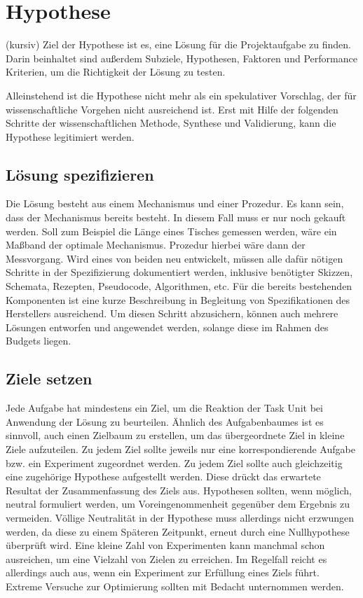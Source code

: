\section{Hypothese}

(kursiv)
Ziel der Hypothese ist es, eine Lösung für die Projektaufgabe zu finden. Darin beinhaltet 
sind außerdem Subziele, Hypothesen, Faktoren und Performance Kriterien, um die Richtigkeit der 
Lösung zu testen.

Alleinstehend ist die Hypothese nicht mehr als ein spekulativer Vorschlag, der für wissenschaftliche 
Vorgehen nicht ausreichend ist. Erst mit Hilfe der folgenden Schritte der wissenschaftlichen Methode, 
Synthese und Validierung, kann die Hypothese legitimiert werden.

    \subsection{Lösung spezifizieren}

    Die Lösung besteht aus einem Mechanismus und einer Prozedur. Es kann sein, dass der Mechanismus
    bereits besteht. In diesem Fall muss er nur noch gekauft werden. Soll zum Beispiel die Länge 
    eines Tisches gemessen werden, wäre ein Maßband der optimale Mechanismus. Prozedur hierbei 
    wäre dann der Messvorgang. Wird eines von beiden neu entwickelt, müssen alle dafür nötigen 
    Schritte in der Spezifizierung dokumentiert werden, inklusive benötigter Skizzen, Schemata, 
    Rezepten, Pseudocode, Algorithmen, etc. Für die bereits bestehenden Komponenten ist eine kurze
    Beschreibung in Begleitung von Spezifikationen des Herstellers ausreichend. 
    Um diesen Schritt abzusichern, können auch mehrere Lösungen entworfen und angewendet werden, 
    solange diese im Rahmen des Budgets liegen.

    \subsection{Ziele setzen}

    Jede Aufgabe hat mindestens ein Ziel, um die Reaktion der Task Unit bei Anwendung der Lösung zu 
    beurteilen. Ähnlich des Aufgabenbaumes ist es sinnvoll, auch einen Zielbaum zu erstellen, um 
    das übergeordnete Ziel in kleine Ziele aufzuteilen. Zu jedem Ziel sollte jeweils nur eine 
    korrespondierende Aufgabe bzw. ein Experiment zugeordnet werden.
    Zu jedem Ziel sollte auch gleichzeitig eine zugehörige Hypothese aufgestellt werden. Diese 
    drückt das erwartete Resultat der Zusammenfassung des Ziels aus. Hypothesen sollten, wenn 
    möglich, neutral formuliert werden, um Voreingenommenheit gegenüber dem Ergebnis zu vermeiden. 
    Völlige Neutralität in der Hypothese muss allerdings nicht erzwungen werden, da diese zu einem 
    Späteren Zeitpunkt, erneut durch eine Nullhypothese überprüft wird. 
    Eine kleine Zahl von Experimenten kann manchmal schon ausreichen, um eine Vielzahl von Zielen 
    zu erreichen. Im Regelfall reicht es allerdings auch aus, wenn ein Experiment zur Erfüllung 
    eines Ziels führt. Extreme Versuche zur Optimierung  sollten mit Bedacht unternommen werden.

